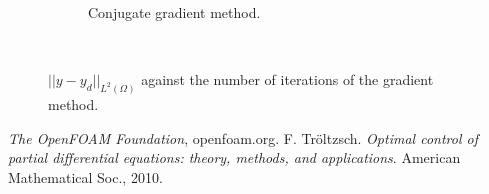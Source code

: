\documentclass[10pt,a4paper]{article}
\begin{document}
\begin{figure}[h]
\begin{subfigure}[b]{0.4\textwidth}
        \caption{Conjugate gradient method.}
        \label{fig:CGcostviterations}
    \end{subfigure}
    ~ %
    \caption{$|| y - y_d ||_{L^2 \left( \Omega \right)}$ against the number of iterations of the gradient method.}\label{fig:Results1}
\end{figure}

\begin{thebibliography}{1}
\textit{The OpenFOAM Foundation}, openfoam.org.
F. Tröltzsch. \textit{Optimal control of partial differential equations: theory, methods, and applications}. American Mathematical Soc., 2010.
\end{thebibliography}
\end{document}

